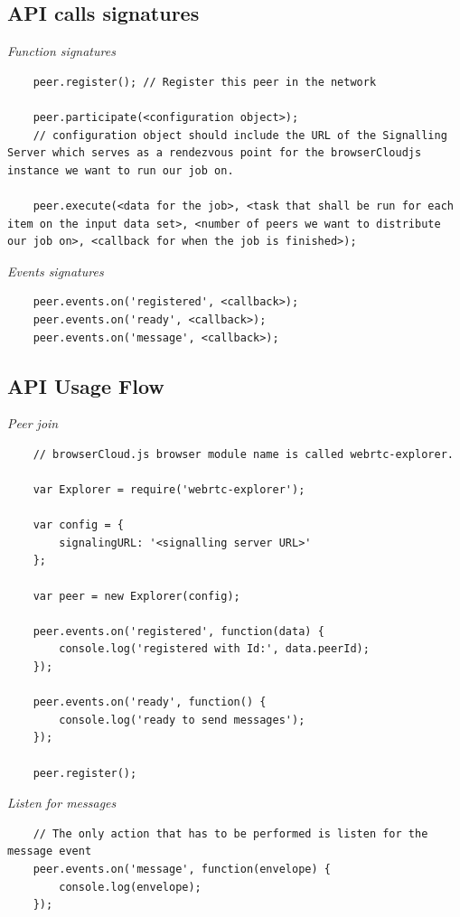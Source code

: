 \subsection{API calls signatures}

\textit{Function signatures}
\begingroup
\scriptsize
\begin{verbatim}
    peer.register(); // Register this peer in the network

    peer.participate(<configuration object>);
    // configuration object should include the URL of the Signalling Server which serves as a rendezvous point for the browserCloudjs instance we want to run our job on. 

    peer.execute(<data for the job>, <task that shall be run for each item on the input data set>, <number of peers we want to distribute our job on>, <callback for when the job is finished>);

\end{verbatim}
\endgroup

\textit{Events signatures}
\begingroup
\scriptsize
\begin{verbatim}
    peer.events.on('registered', <callback>);
    peer.events.on('ready', <callback>);
    peer.events.on('message', <callback>);

\end{verbatim}
\endgroup

\subsection{API Usage Flow}

\textit{Peer join}
\begingroup
\scriptsize
\begin{verbatim}
    // browserCloud.js browser module name is called webrtc-explorer.

    var Explorer = require('webrtc-explorer'); 
    
    var config = {
        signalingURL: '<signalling server URL>'
    };

    var peer = new Explorer(config);

    peer.events.on('registered', function(data) {
        console.log('registered with Id:', data.peerId);
    });

    peer.events.on('ready', function() {
        console.log('ready to send messages');
    });

    peer.register();
\end{verbatim}
\endgroup

\textit{Listen for messages}
\begingroup
\scriptsize
\begin{verbatim}
    // The only action that has to be performed is listen for the message event 
    peer.events.on('message', function(envelope) {
        console.log(envelope);
    });
\end{verbatim}
\endgroup

